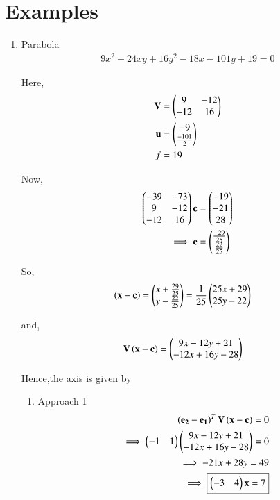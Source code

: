 \documentclass[journal,12pt,twocolumn]{IEEEtran}
\begin{document}
\section{Examples}

\begin{enumerate}
    \item Parabola
    \begin{align}
    9x^2-24xy+16y^2-18x-101y+19 = 0
    \end{align}
    
    Here,
    \begin{align}
    \mathbf{V} &= \begin{pmatrix}9 & -12 \\ -12 & 16\end{pmatrix} \\
    \mathbf{u} &= \begin{pmatrix}-9 \\ \frac{-101}{2}\end{pmatrix} \\
    f &= 19
    \end{align}

    Now,
    \begin{align}
    \begin{pmatrix}-39 & -73 \\ 9 & -12 \\ -12 & 16\end{pmatrix}\mathbf{c} &= \begin{pmatrix}-19 \\ -21 \\ 28\end{pmatrix}
    \\
    \implies \mathbf{c} &= \begin{pmatrix}\frac{-29}{25} \\ \frac{22}{25}\end{pmatrix}
    \end{align}
    
    So,
    \begin{align}
    \left(\mathbf{x}-\mathbf{c}\right) &= \begin{pmatrix}x+\frac{29}{25} \\ y-\frac{22}{25}\end{pmatrix}=\frac{1}{25}\begin{pmatrix}25x+29 \\ 25y-22\end{pmatrix}
    \end{align}

    and,
    \begin{align}
    \mathbf{V}\left(\mathbf{x}-\mathbf{c}\right) &= \begin{pmatrix}9x-12y+21 \\ -12x+16y-28\end{pmatrix}
    \end{align}

    Hence,the axis is given by
    \begin{enumerate}
    \item Approach 1
    \begin{align}
    \left(\mathbf{e_2} - \mathbf{e_1}\right)^T\mathbf{V}\left(\mathbf{x}-\mathbf{c}\right) = 0\\
    \implies \begin{pmatrix}-1 & 1\end{pmatrix}\begin{pmatrix}9x-12y+21 \\ -12x+16y-28\end{pmatrix} = 0
    \\
    \implies -21x + 28y = 49 \\
    \implies \boxed{\begin{pmatrix}-3 & 4\end{pmatrix}\mathbf{x} = 7}
    \end{align}
    

\end{enumerate}
\end{enumerate}
\end{document}
